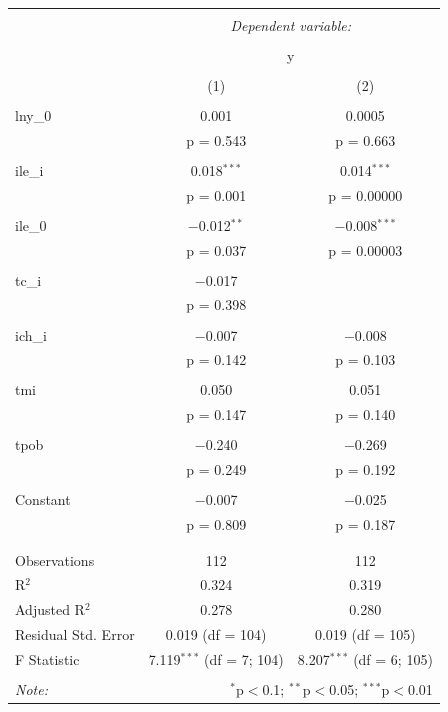 \begin{table}[!htbp] \centering 
    \tiny
  \caption{} 
  \label{} 
\begin{tabular}{@{\extracolsep{5pt}}lcc} 
\\[-1.8ex]\hline 
\hline \\[-1.8ex] 
 & \multicolumn{2}{c}{\textit{Dependent variable:}} \\ 
\cline{2-3} 
\\[-1.8ex] & \multicolumn{2}{c}{y} \\ 
\\[-1.8ex] & (1) & (2)\\ 
\hline \\[-1.8ex] 
 lny\_0 & 0.001 & 0.0005 \\ 
  & p = 0.543 & p = 0.663 \\ 
  & & \\ 
 ile\_i & 0.018$^{***}$ & 0.014$^{***}$ \\ 
  & p = 0.001 & p = 0.00000 \\ 
  & & \\ 
 ile\_0 & $-$0.012$^{**}$ & $-$0.008$^{***}$ \\ 
  & p = 0.037 & p = 0.00003 \\ 
  & & \\ 
 tc\_i & $-$0.017 &  \\ 
  & p = 0.398 &  \\ 
  & & \\ 
 ich\_i & $-$0.007 & $-$0.008 \\ 
  & p = 0.142 & p = 0.103 \\ 
  & & \\ 
 tmi & 0.050 & 0.051 \\ 
  & p = 0.147 & p = 0.140 \\ 
  & & \\ 
 tpob & $-$0.240 & $-$0.269 \\ 
  & p = 0.249 & p = 0.192 \\ 
  & & \\ 
 Constant & $-$0.007 & $-$0.025 \\ 
  & p = 0.809 & p = 0.187 \\ 
  & & \\ 
\hline \\[-1.8ex] 
Observations & 112 & 112 \\ 
R$^{2}$ & 0.324 & 0.319 \\ 
Adjusted R$^{2}$ & 0.278 & 0.280 \\ 
Residual Std. Error & 0.019 (df = 104) & 0.019 (df = 105) \\ 
F Statistic & 7.119$^{***}$ (df = 7; 104) & 8.207$^{***}$ (df = 6; 105) \\ 
\hline 
\hline \\[-1.8ex] 
\textit{Note:}  & \multicolumn{2}{r}{$^{*}$p$<$0.1; $^{**}$p$<$0.05; $^{***}$p$<$0.01} \\ 
\end{tabular} 
\end{table} 


